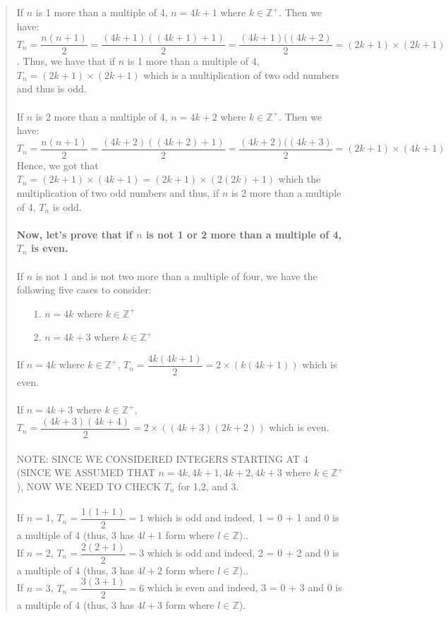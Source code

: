 \documentclass[12pt, a4paper]{article}                      %
\newcommand{\intz}{\mathbb{Z}}
\newcommand{\intzp}{\mathbb{Z^+}}
\begin{document}
\begin{itemize}
\begin{quote}
If $n$ is 1 more than a multiple of 4, $n = 4k + 1$ where $k \in \intzp$. Then we have:
$$T_n = \dfrac{n(n+1)}{2} = \dfrac{(4k + 1)((4k + 1) + 1)}{2} = \dfrac{(4k + 1)((4k + 2)}{2} = (2k + 1) \times (2k + 1)$$.
Thus, we have that if $n$ is 1 more than a multiple of 4, $T_n = (2k + 1) \times (2k + 1)$ which is a multiplication of two
odd numbers and thus is odd.
\\\\
If $n$ is 2 more than a multiple of 4, $n = 4k + 2$ where $k \in \intzp$. Then we have:
$$T_n = \dfrac{n(n+1)}{2} = \dfrac{(4k + 2)((4k + 2) + 1)}{2} = \dfrac{(4k + 2)((4k + 3)}{2} = (2k + 1) \times (4k + 1)$$
Hence, we got that $T_n = (2k + 1) \times (4k + 1) = (2k + 1) \times (2(2k) + 1)$ which the multiplication of two odd
numbers and thus, if $n$ is 2 more than a multiple of 4, $T_n$ is odd.
\\\\
\textbf{Now, let's prove that if $n$ is not 1 or 2 more than a multiple of 4, $T_n$ is even.}\\\\
If $n$ is not $1$ and is not two more than a multiple of four, we have the following five cases to consider:
\begin{itemize}
\item[1.]
$n = 4k$ where $k \in \intzp$
\item[2.]
$n = 4k + 3$ where $k \in \intzp$
\end{itemize}
If $n = 4k$ where $k \in \intzp$, $T_n = \dfrac{4k(4k+1)}{2} = 2 \times (k(4k + 1))$ which is even.
\\\\
If $n = 4k + 3$ where $k \in \intzp$, $T_n = \dfrac{(4k+3)(4k+4)}{2} = 2 \times ((4k + 3)(2k + 2))$ which is even.
\\\\
NOTE: SINCE WE CONSIDERED INTEGERS STARTING AT 4 (SINCE WE ASSUMED THAT $n = 4k,4k+1,4k+2,4k+3$ where $k \in \intzp$),
NOW WE NEED TO CHECK $T_n$ for 1,2, and 3.
\\\\
If $n = 1$, $T_n = \dfrac{1(1+1)}{2} = 1$ which is odd and indeed, 1 = 0 + 1 and 0 is a multiple of 4 (thus, 3 has $4l + 1$ form where $l \in \intz$)..
\\
If $n = 2$, $T_n = \dfrac{2(2+1)}{2} = 3$ which is odd and indeed, 2 = 0 + 2 and 0 is a multiple of 4 (thus, 3 has $4l + 2$ form where $l \in \intz$)..
\\
If $n = 3$, $T_n = \dfrac{3(3+1)}{2} = 6$ which is even and indeed, 3 = 0 + 3 and 0 is a multiple of 4 (thus, 3 has $4l + 3$ form where $l \in \intz$).

\end{quote}
\end{itemize}
\end{document}
